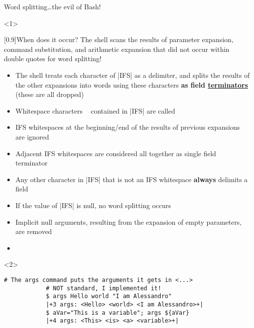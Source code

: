 \begin{frame}[fragile]{Word splitting}{\ldots{}the evil of Bash!}
    \vspace{-6mm}
    \begin{onlyenv}<1>
        \begin{varblock}{}[0.9\textwidth]{When does it occur?}
            The shell scans the results of parameter expansion, command substitution, and arithmetic expansion that did not occur within double quotes for word splitting!
        \end{varblock}
        \begin{itemize}
            \item The shell treats each character of \bash|IFS| as a delimiter, and splits the results of the other expansions into words using these characters \textbf{as field \alert{\underline{terminators}}} (these are all dropped)
            \item Whitespace characters $\;$$\;$ contained in \bash|IFS| are called 
            \item \alert{IFS whitespaces at the beginning/end} of the results of previous expansions \alert{are ignored}
            \item \alert{Adjacent IFS whitespaces} are considered all together as \alert{single field terminator}
            \item \alert{Any other character} in \bash|IFS| that is not an IFS whitespace \alert{\textbf{always} delimits a field}
            \item If the value of \bash|IFS| is null, no word splitting occurs
            \item Implicit null arguments, resulting from the expansion of empty parameters, are removed
            \item {}
        \end{itemize}
    \end{onlyenv}
    \begin{onlyenv}<2>
        \begin{lstlisting}[style=MyBash, style=oddnumbers, aboveskip=3mm]
            # The args command puts the arguments it gets in <...>
            # NOT standard, I implemented it!
            $ args Hello world "I am Alessandro"
            |+3 args: <Hello> <world> <I am Alessandro>+|
            $ aVar="This is a variable"; args ${aVar}
            |+4 args: <This> <is> <a> <variable>+|

\end{lstlisting}
\end{onlyenv}
\end{frame}
